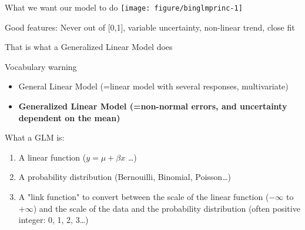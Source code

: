 \documentclass[10pt]{beamer}\usepackage[]{graphicx}\usepackage[]{color}
\newenvironment{knitrout}{}{} %
\begin{document}
\begin{frame}[fragile]{What we want our model to do}
\begin{knitrout}\small
{}\color{fgcolor}
\texttt{[image: figure/binglmprinc-1]} 

\end{knitrout}
    \begin{alertblock}{Good features:}
    Never out of [0,1], variable uncertainty, non-linear trend, close fit
  \end{alertblock}
\end{frame}

\begin{frame}{That is what a Generalized Linear Model does}

\begin{block}{Vocabulary warning}
  \begin{itemize}
    \item General Linear Model (=linear model with several responses, multivariate)
    \item \textbf{Generalized Linear Model (=non-normal errors, and uncertainty dependent on the mean)} 
  \end{itemize}
\end{block}

\pause

\begin{block}{What a GLM is:}
  \begin{enumerate}
    \item A linear function ($y = \mu + \beta x$ \dots)
    \item A probability distribution (Bernouilli, Binomial, Poisson\dots)
    \item A "link function" to convert between the scale of the linear function ($-\infty$ to $+\infty$) and the scale of the data and the probability distribution (often positive integer: 0, 1, 2, 3\dots)
  \end{enumerate}
\end{block}

\end{frame}
\end{document}

